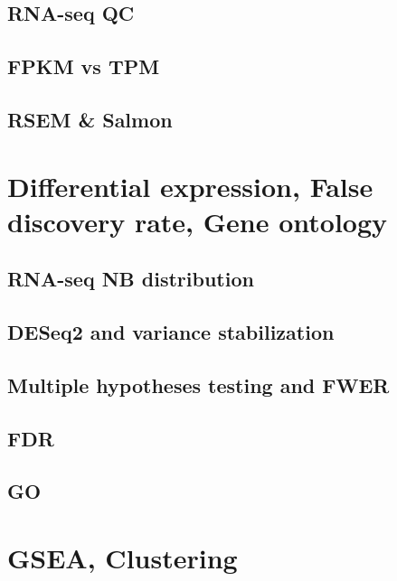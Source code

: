 \documentclass[]{book}
\begin{document}
\hypertarget{rna-seq-qc}{%
\section{RNA-seq QC}\label{rna-seq-qc}}

\hypertarget{fpkm-vs-tpm}{%
\section{FPKM vs TPM}\label{fpkm-vs-tpm}}

\hypertarget{rsem-salmon}{%
\section{RSEM \& Salmon}\label{rsem-salmon}}

\hypertarget{de}{%
\chapter{Differential expression, False discovery rate, Gene ontology}\label{de}}

\hypertarget{rna-seq-nb-distribution}{%
\section{RNA-seq NB distribution}\label{rna-seq-nb-distribution}}

\hypertarget{deseq2-and-variance-stabilization}{%
\section{DESeq2 and variance stabilization}\label{deseq2-and-variance-stabilization}}

\hypertarget{multiple-hypotheses-testing-and-fwer}{%
\section{Multiple hypotheses testing and FWER}\label{multiple-hypotheses-testing-and-fwer}}

\hypertarget{fdr}{%
\section{FDR}\label{fdr}}

\hypertarget{go}{%
\section{GO}\label{go}}

\hypertarget{gsea}{%
\chapter{GSEA, Clustering}\label{gsea}}
\end{document}

